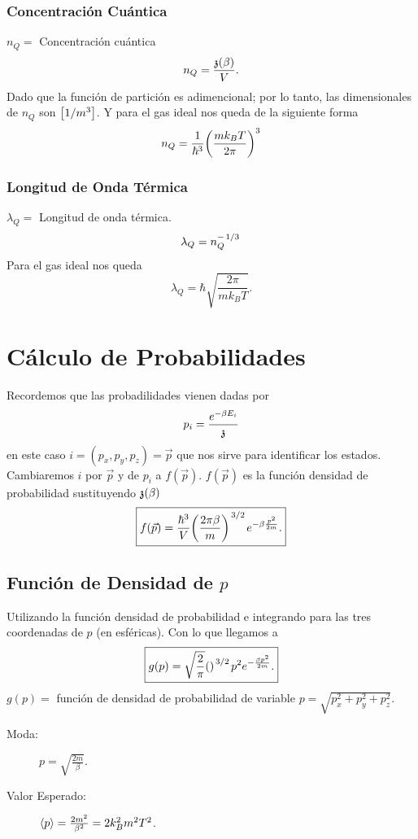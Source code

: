 \subsubsection{Concentración Cuántica}
$n_Q = $ Concentración cuántica
    $$ n_Q = \frac{\mathfrak{z} (\beta)}{V}. $$
Dado que la función de partición es adimencional; por lo tanto, las dimensionales de $n_Q$ son $\qty[1/m^3]$. Y para el gas ideal nos queda de la siguiente forma
    $$ n_Q = \frac{1}{\hbar ^3} \qty(\frac{mk_B T}{2\pi})^3 $$
\subsubsection{Longitud de Onda Térmica}
$\lambda _Q = $ Longitud de onda térmica.
    $$ \lambda _Q = n_Q ^{-\flatfrac{1}{3}} $$
Para el gas ideal nos queda
    $$ \lambda _Q = \hbar \sqrt{\frac{2\pi}{mk_B T}}. $$


\section{Cálculo de Probabilidades}

Recordemos que las probadilidades vienen dadas por
    $$ p_i = \frac{e^{-\beta E_i}}{\mathfrak{z}} $$
en este caso $i = (p_x,p_y,p_z) = \vec{p}$ que nos sirve para identificar los estados. Cambiaremos $i$ por $\vec{p}$ y de $p_i$ a $f(\vec{p})$. $f(\vec{p})$ es la función densidad de probabilidad sustituyendo $\mathfrak{z} (\beta)$
    $$ \boxed{ f(\vec{p}) = \frac{\hbar ^3}{V} \qty(\frac{2\pi \beta}{m})^{\flatfrac{3}{2}} e^{-\beta \frac{p^2}{2m}}. } $$
\subsection{Función de Densidad de $p$}
Utilizando la función densidad de probabilidad e integrando para las tres coordenadas de $p$ (en esféricas). Con lo que llegamos a 
    $$ \boxed{ g(p) = \sqrt{\frac{2}{\pi}} \qty()^{\flatfrac{3}{2}} p^2 e^{-\frac{\beta p^2}{2m}}. } $$
$g(p) = $ función de densidad de probabilidad de variable $p = \sqrt{p_x ^2 + p_y ^2 + p_z ^2}.$
\begin{description}
    \item[Moda: ] $p = \sqrt{\frac{2m}{\beta}}$.
    \item[Valor Esperado: ] $\expval{p} = \frac{2m^2}{\beta ^2} = 2k_B ^2 m^2 T^2$.
\end{description}

